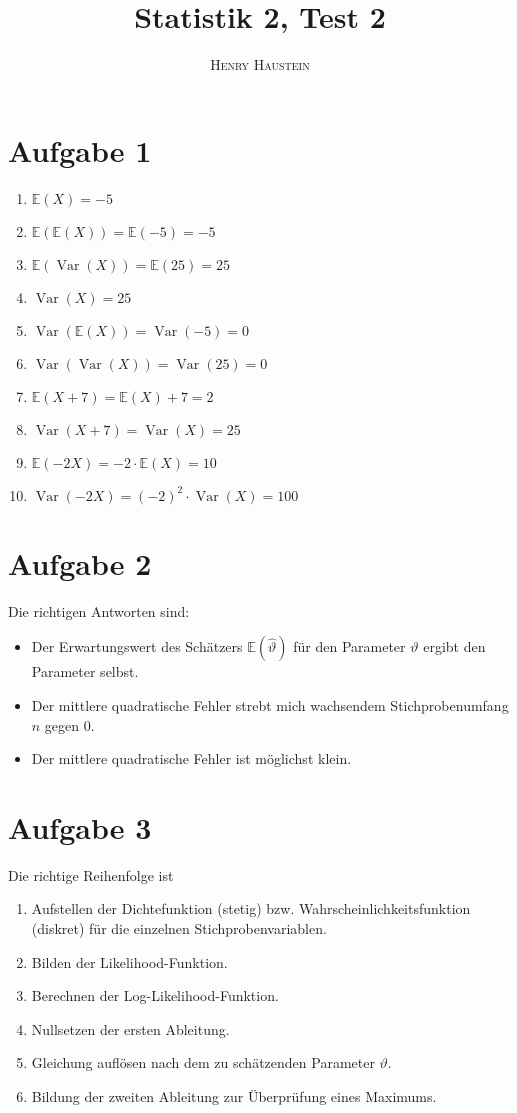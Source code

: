 \documentclass{article}
\title{\textbf{Statistik 2, Test 2}}
\author{\textsc{Henry Haustein}}
\date{}
\DeclareMathOperator{\Var}{Var}
\newcommand{\E}{\mathbb{E}}
\begin{document}
	\maketitle
	
	\section*{Aufgabe 1}
	\begin{enumerate}[label=(\alph*)]
		\item $\E(X) = -5$
		\item $\E(\E(X)) = \E(-5) = -5$
		\item $\E(\Var(X)) = \E(25) = 25$
		\item $\Var(X) = 25$
		\item $\Var(\E(X)) = \Var(-5) = 0$
		\item $\Var(\Var(X)) = \Var(25) = 0$
		\item $\E(X+7) = \E(X) + 7 = 2$
		\item $\Var(X+7) = \Var(X) = 25$
		\item $\E(-2X) = -2\cdot \E(X) = 10$
		\item $\Var(-2X) = (-2)^2\cdot \Var(X) = 100$
	\end{enumerate}

	\section*{Aufgabe 2}
	Die richtigen Antworten sind:
	\begin{itemize}
		\item Der Erwartungswert des Schätzers $\E(\hat{\vartheta})$ für den Parameter $\vartheta$ ergibt den Parameter selbst.
		\item Der mittlere quadratische Fehler strebt mich wachsendem Stichprobenumfang $n$ gegen 0.
		\item Der mittlere quadratische Fehler ist möglichst klein.
	\end{itemize}

	\section*{Aufgabe 3}
	Die richtige Reihenfolge ist
	\begin{enumerate}[label=\arabic*.]
		\item Aufstellen der Dichtefunktion (stetig) bzw. Wahrscheinlichkeitsfunktion (diskret) für die einzelnen Stichprobenvariablen.
		\item Bilden der Likelihood-Funktion.
		\item Berechnen der Log-Likelihood-Funktion.
		\item Nullsetzen der ersten Ableitung.
		\item Gleichung auflösen nach dem zu schätzenden Parameter $\vartheta$.
		\item Bildung der zweiten Ableitung zur Überprüfung eines Maximums.
	\end{enumerate}
\end{document}
